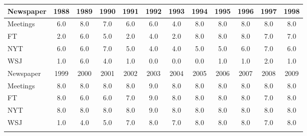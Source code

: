\begin{tabular}{lccccccccccc}
\hline\hline 
\addlinespace 
Newspaper & 1988 & 1989 & 1990 & 1991 & 1992 & 1993 & 1994 & 1995 & 1996 & 1997 & 1998 \\ 
\hline 
Meetings & 6.0 & 8.0 & 7.0 & 6.0 & 6.0 & 4.0 & 8.0 & 8.0 & 8.0 & 8.0 & 8.0 \\
FT & 2.0 & 6.0 & 5.0 & 2.0 & 4.0 & 2.0 & 8.0 & 8.0 & 8.0 & 7.0 & 7.0 \\
NYT & 6.0 & 6.0 & 7.0 & 5.0 & 4.0 & 4.0 & 5.0 & 5.0 & 6.0 & 7.0 & 6.0 \\
WSJ & 1.0 & 6.0 & 4.0 & 1.0 & 0.0 & 0.0 & 0.0 & 1.0 & 1.0 & 2.0 & 1.0 \\
\hline 
\addlinespace 
Newspaper & 1999 & 2000 & 2001 & 2002 & 2003 & 2004 & 2005 & 2006 & 2007 & 2008 & 2009 \\ 
\hline 
Meetings & 8.0 & 8.0 & 8.0 & 8.0 & 9.0 & 8.0 & 8.0 & 8.0 & 8.0 & 8.0 & 8.0 \\
FT & 8.0 & 6.0 & 6.0 & 7.0 & 9.0 & 8.0 & 8.0 & 8.0 & 8.0 & 7.0 & 8.0 \\
NYT & 8.0 & 8.0 & 8.0 & 8.0 & 9.0 & 8.0 & 8.0 & 8.0 & 8.0 & 8.0 & 8.0 \\
WSJ & 1.0 & 4.0 & 5.0 & 7.0 & 8.0 & 7.0 & 8.0 & 8.0 & 8.0 & 7.0 & 8.0 \\
\hline 
\addlinespace 
\end{tabular}